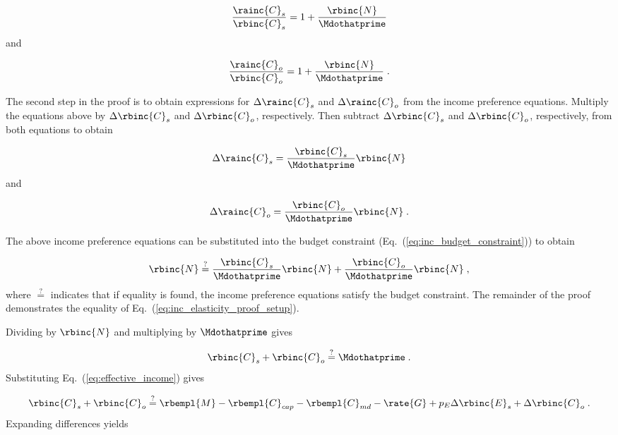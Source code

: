 \begin{equation}
    \frac{\rainc{C}_s}{\rbinc{C}_s} = 1 + \frac{\rbinc{N}}{\Mdothatprime}
\end{equation}
%
and

\begin{equation}
  \frac{\rainc{C}_o}{\rbinc{C}_o} = 1 + \frac{\rbinc{N}}{\Mdothatprime} \; .
\end{equation}
%

The second step in the proof is to obtain expressions 
for $\Delta \rainc{C}_s$ and $\Delta \rainc{C}_o$
from the income preference equations.
Multiply the equations above by $\Delta \rbinc{C}_s$ and $\Delta \rbinc{C}_o$, respectively.
Then subtract $\Delta \rbinc{C}_s$ and $\Delta \rbinc{C}_o$, respectively, from both equations to obtain

\begin{equation}
  \Delta \rainc{C}_s = \frac{\rbinc{C}_s}{\Mdothatprime} \rbinc{N}
\end{equation}
%
and

\begin{equation}
  \Delta \rainc{C}_o = \frac{\rbinc{C}_o}{\Mdothatprime} \rbinc{N} \; .
\end{equation}

The above income preference equations can be substituted into the budget constraint
(Eq.~(\ref{eq:inc_budget_constraint})) to obtain

\begin{equation} \label{eq:inc_elasticity_proof_setup}
  \rbinc{N} \stackrel{?}{=} \frac{\rbinc{C}_s}{\Mdothatprime} \rbinc{N} 
                            + \frac{\rbinc{C}_o}{\Mdothatprime}  \rbinc{N} \; ,
\end{equation}
%
where $\stackrel{?}{=}$ indicates that if equality is found, 
the income preference equations satisfy the budget constraint.
The remainder of the proof demonstrates the equality
of Eq.~(\ref{eq:inc_elasticity_proof_setup}).

Dividing by $\rbinc{N}$ and multiplying by $\Mdothatprime$ gives

\begin{equation}
  \rbinc{C}_s + \rbinc{C}_o \stackrel{?}{=} \Mdothatprime \; .
\end{equation}
%
Substituting Eq.~(\ref{eq:effective_income}) gives

\begin{equation}
  \rbinc{C}_s + \rbinc{C}_o \stackrel{?}{=} \rbempl{M} - \rbempl{C}_{cap} - \rbempl{C}_{md} 
                       - \rate{G} + p_E \Delta \rbinc{E}_s + \Delta \rbinc{C}_o \; .
\end{equation}
%
Expanding differences yields

